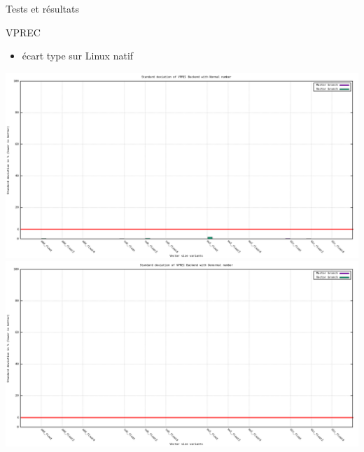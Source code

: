 \documentclass{beamer}
\begin{document}
\begin{frame}{Tests et résultats}

  \begin{block}{VPREC}
    \begin{itemize}
    \item écart type sur Linux natif
    \end{itemize}
    \centering\includegraphics[scale=0.2]{../ressources/laptop_vprec_normal_stddev.png}
    \centering\includegraphics[scale=0.2]{../ressources/laptop_vprec_denormal_stddev.png}
  \end{block}

\end{frame}
\end{document}
